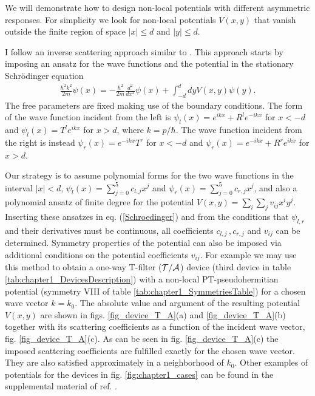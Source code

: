 We will demonstrate how to design non-local potentials with different asymmetric responses.
For simplicity we look for non-local potentials $V(x,y)$ that vanish outside the finite region of space $|x| \leq d$ and $|y| \leq d$.

I follow an inverse scattering approach similar to \cite{Palao1998}. This approach starts by imposing an ansatz for the wave functions and the potential in the stationary Schr\"{o}dinger equation
%
\begin{eqnarray}
  \frac{\hbar^2k^2}{2m} \psi (x) = - \frac{\hbar^2}{2m} \frac{d^2}{dx^2} \psi (x)
  +\!\!\int_{-d}^d \!dy V(x, y) \psi(y).
  \label{Schroedinger}
\end{eqnarray}
%
The free parameters are fixed making use of the boundary conditions.
The form of the wave function incident from the left is
$\psi_l(x) = e^{i k x} + R^l e^{-i k x}$ for $x < -d$ and $\psi_l (x) = T^l e^{i k x}$ for $x > d$,
where  $k=p/\hbar$.
The wave function incident from the right is instead
$\psi_r(x) = e^{-ikx} T^r$ for $x < -d$ and $\psi_r (x) = e^{-i k x} + R^r e^{i k x}$ for $x > d$.

Our strategy is to assume  polynomial forms for the two wave functions in the interval $|x| < d$,
$\psi_l (x) = \sum_{j=0}^5 c_{l,j} x^j$ and $\psi_r (x) = \sum_{j=0}^5 c_{r,j} x^j$, and also a
polynomial ansatz of finite degree for the potential $V(x,y) = \sum_i \sum_j v_{ij} x^i y^j$.
Inserting these ansatzes in eq. (\ref{Schroedinger}) and from the conditions that $\psi_{l,r}$
and their derivatives must be continuous, all coefficients $c_{l,j}\,,c_{r,j}$ and $v_{ij}$ can be determined.
Symmetry properties of the potential can also be imposed via additional conditions on
the potential coefficients $v_{ij}$. For example we may use this method to obtain a one-way T-filter ($\cal{T/A}$) device (third device in table \ref{tab:chapter1_DevicesDescription}) with a non-local PT-pseudohermitian potential (symmetry VIII of table \ref{tab:chapter1_SymmetriesTable}) for a chosen wave vector $k = k_0$. The absolute value and argument of the resulting potential $V(x,y)$ are shown in figs. \ref{fig_device_T_A}(a) and \ref{fig_device_T_A}(b) together with its scattering coefficients as a function of the incident wave vector, fig. \ref{fig_device_T_A}(c). As can be seen in fig. \ref{fig_device_T_A}(c) the imposed scattering coefficients are fulfilled exactly for the chosen wave vector. They are also satisfied approximately in a neighborhood of $k_0$.
Other examples of potentials for the devices in fig. \ref{fig:chapter1_cases} can be found in the supplemental material of ref. \cite{Ruschhaupt2017}.
%
%
%
%
%

